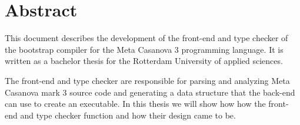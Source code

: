 \section*{Abstract}
This document describes the development of the front-end and type checker of the bootstrap compiler for the Meta Casanova 3 programming language. 
It is written as a bachelor thesis for the Rotterdam University of applied sciences.


The front-end and type checker are responsible for parsing and analyzing Meta Casanova mark 3 source code and generating a data structure that the back-end can use to create an executable.
In this thesis we will show how how the front-end and type checker function and how their design came to be. 
